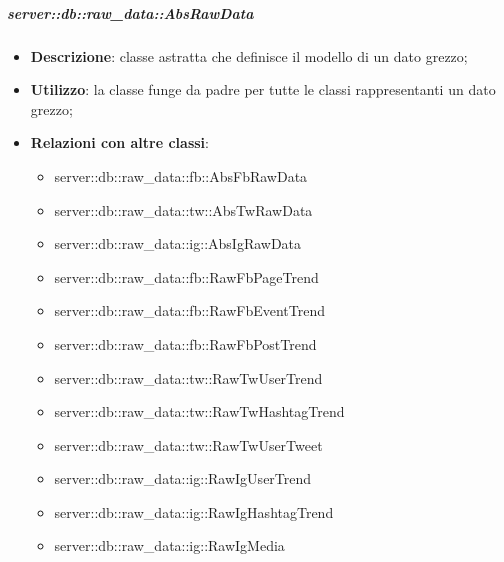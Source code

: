 		\subparagraph{server::db::raw\_data::AbsRawData} %
		\label{subp:bdsm_app_server_raw_data_absrawdata}
			\begin{itemize}
				\item \textbf{Descrizione}: classe astratta che definisce il modello di un dato grezzo;
				\item \textbf{Utilizzo}: la classe funge da padre per tutte le classi rappresentanti un dato grezzo;
				\item \textbf{Relazioni con altre classi}:
					\begin{itemize}
						\item server::db::raw\_data::fb::AbsFbRawData
						\item server::db::raw\_data::tw::AbsTwRawData
						\item server::db::raw\_data::ig::AbsIgRawData
						\item server::db::raw\_data::fb::RawFbPageTrend
						\item server::db::raw\_data::fb::RawFbEventTrend
						\item server::db::raw\_data::fb::RawFbPostTrend
						\item server::db::raw\_data::tw::RawTwUserTrend
						\item server::db::raw\_data::tw::RawTwHashtagTrend
						\item server::db::raw\_data::tw::RawTwUserTweet
						\item server::db::raw\_data::ig::RawIgUserTrend
						\item server::db::raw\_data::ig::RawIgHashtagTrend
						\item server::db::raw\_data::ig::RawIgMedia
					\end{itemize}
			\end{itemize}


